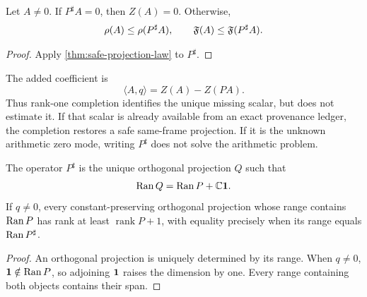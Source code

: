 \begin{corollary}
\label{cor:repaired-monotonicity}
Let \(A\ne0\).  If \(P^\sharp A=0\), then \(Z(A)=0\).  Otherwise,
\[
 \rho(A)\le\rho(P^\sharp A),
\qquad
 \mathfrak F(A)\le\mathfrak F(P^\sharp A).
\]
\end{corollary}

\begin{proof}
Apply \cref{thm:safe-projection-law} to \(P^\sharp\).
\end{proof}

\begin{remark}
\label{rem:repair-not-free}
The added coefficient is
\[
 \langle A,q\rangle
 =
 Z(A)-Z(PA).
\]
Thus rank-one completion identifies the unique missing scalar, but
does not estimate it.  If that scalar is already available from an
exact provenance ledger, the completion restores a safe
same-frame projection.  If it is the unknown arithmetic zero mode,
writing \(P^\sharp\) does not solve the arithmetic problem.
\end{remark}

\begin{proposition}
\label{prop:minimal-uniqueness}
The operator \(P^\sharp\) is the unique orthogonal projection \(Q\)
such that
\[
 \operatorname{Ran} Q=\operatorname{Ran} P+\mathbb C\mathbf 1.
\]
If \(q\ne0\), every constant-preserving orthogonal projection whose
range contains \(\operatorname{Ran} P\) has rank at least
\(\operatorname{rank}P+1\), with equality precisely when its range
equals \(\operatorname{Ran} P^\sharp\).
\end{proposition}

\begin{proof}
An orthogonal projection is uniquely determined by its range.
When \(q\ne0\), \(\mathbf 1\notin\operatorname{Ran} P\), so adjoining \(\mathbf 1\) raises
the dimension by one.  Every range containing both objects contains
their span.
\end{proof}
